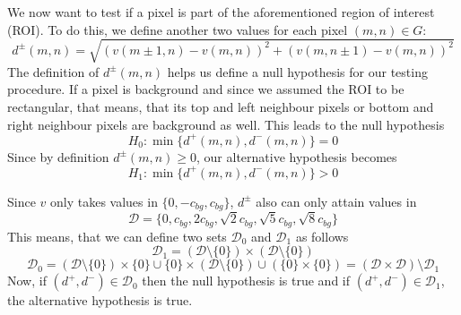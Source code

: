 \documentclass{beamer}
\begin{document}
\begin{frame}
	We now want to test if a pixel is part of the aforementioned region of interest (ROI). To do this, we define another two values for each pixel $(m, n) \in G$:
	\begin{equation}\label{d}
		d^\pm(m, n) = \sqrt{(v(m \pm 1, n) - v(m, n))^2 + (v(m, n \pm 1) - v(m, n))^2}
	\end{equation}
	The definition of $d^\pm(m, n)$ helps us define a null hypothesis for our testing procedure. If a pixel is background and since we assumed the ROI to be rectangular, that means, that its top and left neighbour pixels or bottom and right neighbour pixels are background as well. This leads to the null hypothesis
	\begin{equation}
		H_0 : \min\{ d^+(m, n), d^-(m, n) \} = 0
	\end{equation}
	Since by definition $d^\pm(m, n) \geq 0$, our alternative hypothesis becomes
	\begin{equation}
		H_1 : \min\{ d^+(m, n), d^-(m, n) \} > 0
	\end{equation}
\end{frame}

\begin{frame}
	Since $v$ only takes values in $\{ 0, -c_{bg}, c_{bg} \}$, $d^\pm$ also can only attain values in
	\begin{equation*}
		\mathcal{D} = \{ 0, c_{bg}, 2 c_{bg}, \sqrt{2} c_{bg}, \sqrt{5} c_{bg}, \sqrt{8} c_{bg} \}
	\end{equation*}
	This means, that we can define two sets $\mathcal{D}_0$ and $\mathcal{D}_1$ as follows
	\begin{equation*}
		\mathcal{D}_1 = ( \mathcal{D} \setminus \{ 0 \} ) \times ( \mathcal{D} \setminus \{ 0 \} )
	\end{equation*}
	\begin{equation*}
		\mathcal{D}_0 = ( \mathcal{D} \setminus \{ 0 \} ) \times \{ 0 \} \cup \{ 0 \} \times ( \mathcal{D} \setminus \{ 0 \} ) \cup ( \{ 0 \} \times \{ 0 \} ) = ( \mathcal{D} \times \mathcal{D} ) \setminus \mathcal{D}_1
	\end{equation*}
	Now, if $(d^+, d^-) \in \mathcal{D}_0$ then the null hypothesis is true and if $(d^+, d^-) \in \mathcal{D}_1$, the alternative hypothesis is true.
\end{frame}
\end{document}
